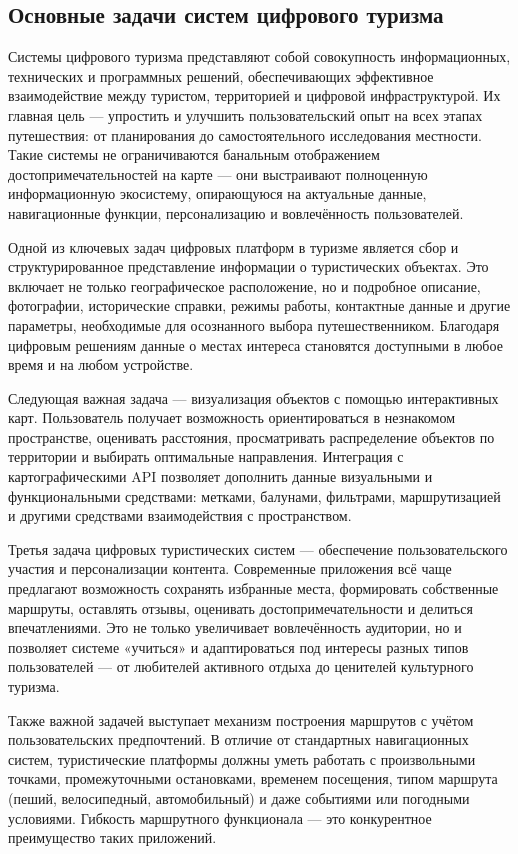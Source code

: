 \subsection{Основные задачи систем цифрового туризма}

Системы цифрового туризма представляют собой совокупность информационных, технических и программных решений, обеспечивающих эффективное взаимодействие между туристом, территорией и цифровой инфраструктурой. Их главная цель — упростить и улучшить пользовательский опыт на всех этапах путешествия: от планирования до самостоятельного исследования местности. Такие системы не ограничиваются банальным отображением достопримечательностей на карте — они выстраивают полноценную информационную экосистему, опирающуюся на актуальные данные, навигационные функции, персонализацию и вовлечённость пользователей.

Одной из ключевых задач цифровых платформ\cite{b1} в туризме является сбор и структурированное представление информации о туристических объектах. Это включает не только географическое расположение, но и подробное описание, фотографии, исторические справки, режимы работы, контактные данные и другие параметры, необходимые для осознанного выбора путешественником. Благодаря цифровым решениям данные о местах интереса становятся доступными в любое время и на любом устройстве.

Следующая важная задача — визуализация объектов с помощью интерактивных карт. Пользователь получает возможность ориентироваться в незнакомом пространстве, оценивать расстояния, просматривать распределение объектов по территории и выбирать оптимальные направления. Интеграция с картографическими API позволяет дополнить данные визуальными и функциональными средствами: метками, балунами, фильтрами, маршрутизацией и другими средствами взаимодействия с пространством.

Третья задача цифровых туристических систем — обеспечение пользовательского участия и персонализации контента. Современные приложения всё чаще предлагают возможность сохранять избранные места, формировать собственные маршруты, оставлять отзывы, оценивать достопримечательности и делиться впечатлениями. Это не только увеличивает вовлечённость аудитории, но и позволяет системе «учиться» и адаптироваться под интересы разных типов пользователей — от любителей активного отдыха до ценителей культурного туризма.

Также важной задачей выступает механизм построения маршрутов с учётом пользовательских предпочтений. В отличие от стандартных навигационных систем, туристические платформы должны уметь работать с произвольными точками, промежуточными остановками, временем посещения, типом маршрута (пеший, велосипедный, автомобильный) и даже событиями или погодными условиями. Гибкость маршрутного функционала — это конкурентное преимущество таких приложений.

